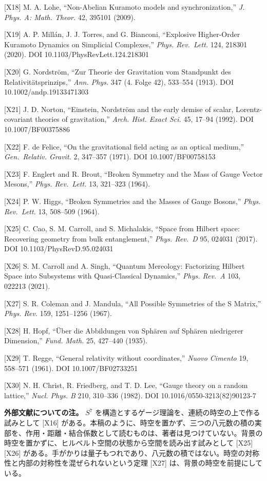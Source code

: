 \documentclass[
  a4paper,
]{ltjsarticle}
\begin{document}
{[}X18{]} M. A. Lohe, ``Non-Abelian Kuramoto models and
synchronization,'' \emph{J. Phys. A: Math. Theor.} 42, 395101 (2009).

{[}X19{]} A. P. Millán, J. J. Torres, and G. Bianconi, ``Explosive
Higher-Order Kuramoto Dynamics on Simplicial Complexes,'' \emph{Phys.
Rev.~Lett.} 124, 218301 (2020). DOI 10.1103/PhysRevLett.124.218301

{[}X20{]} G. Nordström, ``Zur Theorie der Gravitation vom Standpunkt des
Relativitätsprinzips,'' \emph{Ann. Phys.} 347 (4. Folge 42), 533--554
(1913). DOI 10.1002/andp.19133471303

{[}X21{]} J. D. Norton, ``Einstein, Nordström and the early demise of
scalar, Lorentz-covariant theories of gravitation,'' \emph{Arch. Hist.
Exact Sci.} 45, 17--94 (1992). DOI 10.1007/BF00375886

{[}X22{]} F. de Felice, ``On the gravitational field acting as an
optical medium,'' \emph{Gen.~Relativ. Gravit.} 2, 347--357 (1971). DOI
10.1007/BF00758153

{[}X23{]} F. Englert and R. Brout, ``Broken Symmetry and the Mass of
Gauge Vector Mesons,'' \emph{Phys. Rev.~Lett.} 13, 321--323 (1964).

{[}X24{]} P. W. Higgs, ``Broken Symmetries and the Masses of Gauge
Bosons,'' \emph{Phys. Rev.~Lett.} 13, 508--509 (1964).

{[}X25{]} C. Cao, S. M. Carroll, and S. Michalakis, ``Space from Hilbert
space: Recovering geometry from bulk entanglement,'' \emph{Phys. Rev.~D}
95, 024031 (2017). DOI 10.1103/PhysRevD.95.024031

{[}X26{]} S. M. Carroll and A. Singh, ``Quantum Mereology: Factorizing
Hilbert Space into Subsystems with Quasi-Classical Dynamics,''
\emph{Phys. Rev.~A} 103, 022213 (2021).

{[}X27{]} S. R. Coleman and J. Mandula, ``All Possible Symmetries of the
S Matrix,'' \emph{Phys. Rev.} 159, 1251--1256 (1967).

{[}X28{]} H. Hopf, ``Über die Abbildungen von Sphären auf Sphären
niedrigerer Dimension,'' \emph{Fund. Math.} 25, 427--440 (1935).

{[}X29{]} T. Regge, ``General relativity without coordinates,''
\emph{Nuovo Cimento} 19, 558--571 (1961). DOI 10.1007/BF02733251

{[}X30{]} N. H. Christ, R. Friedberg, and T. D. Lee, ``Gauge theory on a
random lattice,'' \emph{Nucl. Phys. B} 210, 310--336 (1982). DOI
10.1016/0550-3213(82)90123-7

\textbf{外部文献についての注。} \(S^7\)
を構造とするゲージ理論を、連続の時空の上で作る試みとして {[}X16{]}
がある。本稿のように、時空を置かず、三つの八元数の積の実部を、作用・距離・結合係数として読むものは、著者は見つけていない。背景の時空を置かずに、ヒルベルト空間の状態から空間を読み出す試みとして
{[}X25{]}{[}X26{]}
がある。手がかりは量子もつれであり、八元数の積ではない。時空の対称性と内部の対称性を混ぜられないという定理
{[}X27{]} は、背景の時空を前提にしている。
\end{document}
